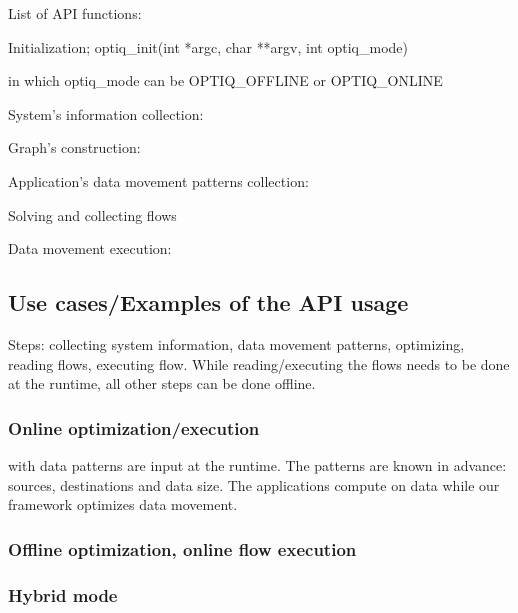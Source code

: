 \documentclass[letter]{article}
\begin{document}
List of API functions:

Initialization;
optiq\_init(int *argc, char **argv, int optiq\_mode)

in which optiq\_mode can be OPTIQ\_OFFLINE or OPTIQ\_ONLINE

System's information collection:

Graph's construction:

Application's data movement patterns collection:

Solving and collecting flows

Data movement execution:


\subsection{Use cases/Examples of the API usage}

Steps: collecting system information, data movement patterns, optimizing, reading flows, executing flow. While reading/executing the flows needs to be done at the runtime, all other steps can be done offline.

\subsubsection{Online optimization/execution} with data patterns are input at the runtime. The patterns are known in advance: sources, destinations and data size. The applications compute on data while our framework optimizes data movement.



\subsubsection{Offline optimization, online flow execution}

\subsubsection{Hybrid mode}
\end{document}
